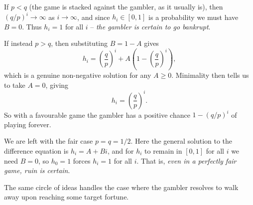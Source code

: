 \documentclass[a4paper]{scrartcl}
\begin{document}
If $p < q$ (the game is stacked against the gambler, as it usually is), then $(q/p)^i \rightarrow \infty$ as $i \rightarrow \infty$, and since $h_i \in [0, 1]$ is a probability we must have $B = 0$. Thus $h_i = 1$ for all $i$ -- \emph{the gambler is certain to go bankrupt}.

If instead $p > q$, then substituting $B = 1 - A$ gives
$$
h_i = \left(\frac{q}{p}\right)^i + A\left(1 - \left(\frac{q}{p}\right)^i\right),
$$
which is a genuine non-negative solution for any $A \geq 0$. Minimality then tells us to take $A = 0$, giving
$$
h_i = \left(\frac{q}{p}\right)^i.
$$
So with a favourable game the gambler has a positive chance $1 - (q/p)^i$ of playing forever.

We are left with the fair case $p = q = 1/2$. Here the general solution to the difference equation is $h_i = A + Bi$, and for $h_i$ to remain in $[0, 1]$ for all $i$ we need $B = 0$, so $h_0 = 1$ forces $h_i = 1$ for all $i$. That is, \emph{even in a perfectly fair game, ruin is certain}.

The same circle of ideas handles the case where the gambler resolves to walk away upon reaching some target fortune.
\end{document}
